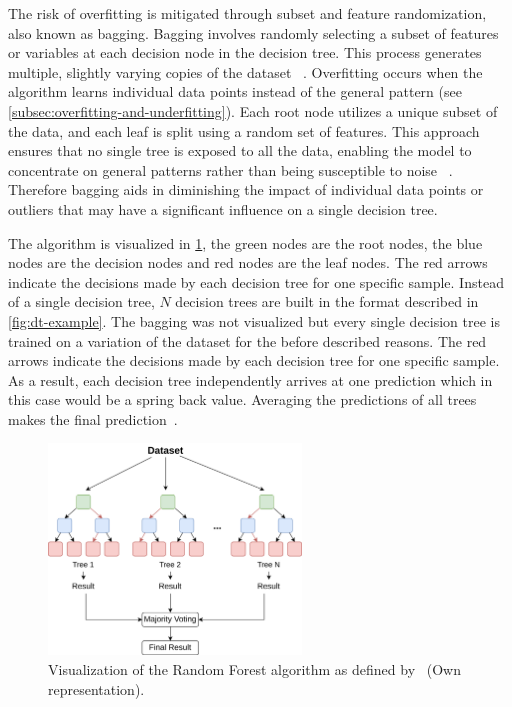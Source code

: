 The risk of overfitting is mitigated through subset and feature randomization, also known as bagging.
Bagging involves randomly selecting a subset of features or variables at each decision node in the decision
tree.
This process generates multiple, slightly varying copies of the dataset
~\cite[p. 340--341]{gareth2013introduction}.
Overfitting occurs when the algorithm learns individual data points instead of
the general pattern (see \cref{subsec:overfitting-and-underfitting}).
Each root node utilizes a unique subset of the data, and each leaf is split using a random set of features.
This approach ensures that no single tree is exposed to all the data, enabling the model to concentrate on general
patterns rather than being susceptible to noise
~\cite[p. 83]{muller2016introduction}.
Therefore bagging aids in diminishing the impact of individual data points or outliers that may have a
significant influence on a single decision tree.

The algorithm is visualized in \cref{fig:rf-example}, the green nodes are the root nodes, the blue
nodes are the decision nodes and red nodes are the leaf nodes.
The red arrows indicate the decisions made by each decision tree for one specific sample.
Instead of a single decision tree, $N$ decision trees are built in the format described in \cref{fig:dt-example}.
The bagging was not visualized but every single decision tree is trained on a variation of the dataset for the before
described reasons.
The red arrows indicate the decisions made by each decision tree for one specific sample.
As a result, each decision tree independently arrives at one prediction which in this case would be a spring back value.
Averaging the predictions of all trees makes the final prediction~\cite[p. 9]{breiman2001random}.

\begin{figure}[h]
    \begin{tcolorbox}[arc=0pt,boxrule=0.5pt]
        \centering
        \includegraphics[width=0.6\textwidth]{chap4/images/random_forest_example}
    \end{tcolorbox}
    \caption{Visualization of the Random Forest algorithm as defined by~\cite[p.1]{breiman2001random} (Own
    representation).
    }
    \label{fig:rf-example}
\end{figure}

